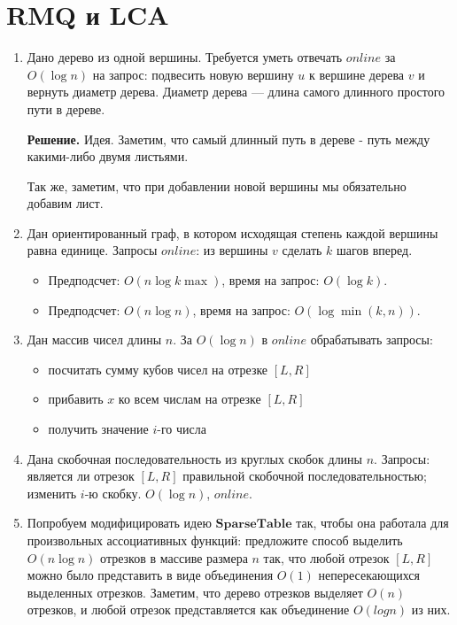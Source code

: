 \section*{RMQ и LCA}
\begin{enumerate}
	\item Дано дерево из одной вершины. Требуется уметь отвечать $online$ за $O(\log n)$ на
	запрос: подвесить новую вершину $u$ к вершине дерева $v$ и вернуть диаметр дерева. Диаметр
	дерева — длина самого длинного простого пути в дереве. 
	
	\textbf{Решение.} Идея. Заметим, что самый длинный путь в дереве - путь между какими-либо двумя листьями.
	
	Так же, заметим, что при добавлении новой вершины мы обязательно добавим лист. 
	
	
	\item Дан ориентированный граф, в котором исходящая степень каждой вершины равна единице.
	Запросы $online$: из вершины $v$ сделать $k$ шагов вперед.
	\begin{itemize}
		\item Предподсчет: $O(n \log k\max)$, время на запрос: $O(\log k)$.
		\item Предподсчет: $O(n \log n)$, время на запрос: $O(\log \min(k, n))$.
	\end{itemize}
	
	\item Дан массив чисел длины $n$. За $O(\log n)$ в $online$ обрабатывать запросы:
	\begin{itemize}
		\item посчитать сумму кубов чисел на отрезке $[L, R]$
		\item прибавить $x$ ко всем числам на отрезке $[L, R]$
		\item получить значение $i$-го числа
	\end{itemize}
	
	\item Дана скобочная последовательность из круглых скобок длины $n$. Запросы: является ли 
	отрезок $[L, R]$ правильной скобочной последовательностью; изменить $i$-ю скобку. $O(\log n)$, $online$.
	
	\item Попробуем модифицировать идею $\mathbf{SparseTable}$ так, чтобы она работала для произвольных ассоциативных функций: предложите способ выделить $O(n \log n)$ отрезков в массиве размера $n$ так, что любой отрезок $[L, R]$ можно было представить в виде объединения $O(1)$ непересекающихся выделенных отрезков. Заметим, что дерево отрезков выделяет $O(n)$ отрезков, и любой отрезок представляется как объединение $O(log n)$ из них.
	

\end{enumerate}
